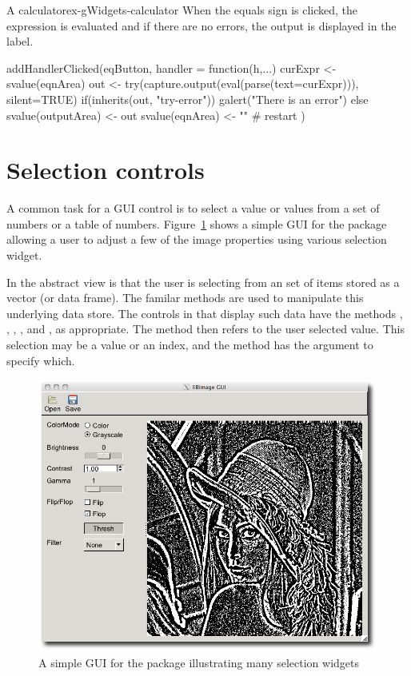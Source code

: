 \begin{example}{A calculator}{ex-gWidgets-calculator}
When the equals sign is clicked, the expression is evaluated and if
there are no errors, the output is displayed in the label.
\begin{Schunk}
\begin{Sinput}
 addHandlerClicked(eqButton, handler = function(h,...) {
   curExpr <- svalue(eqnArea)
   out <- try(capture.output(eval(parse(text=curExpr))), 
              silent=TRUE)
   if(inherits(out, "try-error")) {
     galert("There is an error")
   } else {
     svalue(outputArea) <- out
     svalue(eqnArea) <- ""            # restart
   }
 })
\end{Sinput}
\end{Schunk}

\end{example}

\section{Selection controls}
\label{sec:gWidgets-widg-select-data}

A common task for a GUI control is to select a value or values from a
set of numbers or a table of
numbers. Figure~\ref{fig:gWidgets-EBImage-gui} shows a simple GUI for
the  package allowing a user to adjust a few of the image
properties using various selection widget.

In  the abstract view is that the user is selecting from
an set of items stored as a vector (or data frame). The familar \R\/
methods are used to manipulate this underlying data store. The
controls in  that display such data have the methods
\code{[}, \code{[\ASSIGN}, , ,  and
, as appropriate. The  method then
refers to the user selected value. This selection may be a value or an
index, and the  method has the argument  to
specify which.

\begin{figure}
  \centering
  \includegraphics[width=.75\textwidth]{fig-gWidgets-EBImage-gui}
  \caption{A simple GUI for the  package illustrating many selection widgets}
  \label{fig:gWidgets-EBImage-gui}
\end{figure}

